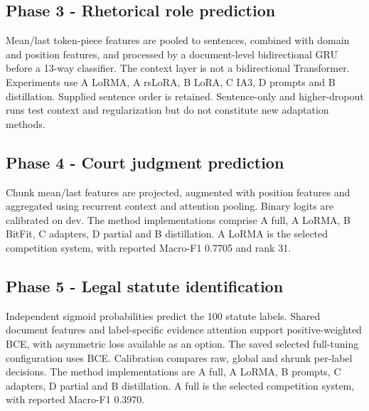 \documentclass[11pt, oneside]{article}
\begin{document}
\subsection{Phase 3 - Rhetorical role prediction}
Mean/last token-piece features are pooled to sentences, combined with domain and
position features, and processed by a document-level bidirectional GRU before a
13-way classifier. The context layer is not a bidirectional Transformer. Experiments
use A LoRMA, A rsLoRA, B LoRA, C IA3, D prompts and B distillation. Supplied sentence
order is retained. Sentence-only and higher-dropout runs test context and regularization
but do not constitute new adaptation methods.

\subsection{Phase 4 - Court judgment prediction}
Chunk mean/last features are projected, augmented with position features and aggregated
using recurrent context and attention pooling. Binary logits are calibrated on dev.
The method implementations comprise A full, A LoRMA, B BitFit, C adapters, D partial
and B distillation. A LoRMA is the selected competition system, with reported
Macro-F1 0.7705 and rank 31.

\subsection{Phase 5 - Legal statute identification}
Independent sigmoid probabilities predict the 100 statute labels. Shared document
features and label-specific evidence attention support positive-weighted BCE, with
asymmetric loss available as an option. The saved selected full-tuning configuration
uses BCE. Calibration compares raw, global and shrunk per-label decisions. The method
implementations are A full, A LoRMA, B prompts, C adapters, D partial and B distillation.
A full is the selected competition system, with reported Macro-F1 0.3970.
\end{document}
